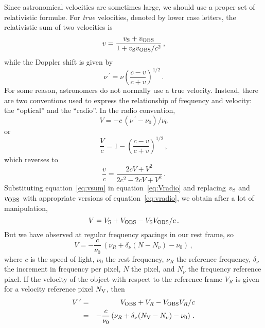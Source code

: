 Since astronomical velocities are sometimes large, we should use a
proper set of relativistic formul\ae.  For {\it true} velocities,
denoted by lower case letters, the relativistic sum of two velocities
is
\begin{equation}
   v =  \frac{v_{\hbox{\scriptsize S}} + v_{\hbox{\scriptsize OBS}}}{1 + v_{\hbox{\scriptsize S}}v_{\hbox{\scriptsize OBS}} / c^2} \, , \label{eq:vsum}
\end{equation}
while the Doppler shift is given by
\begin{equation}
   \nu\,^\prime = \nu\left( \frac{c - v}{c + v} \right)^{1/2} \, .
\end{equation}
For some reason, astronomers do not normally use a true velocity.
Instead, there are two conventions used to express the relationship of
frequency and velocity: the ``optical'' and the ``radio''.  In the
radio convention,
\begin{displaymath}
    V = -c\, (\nu\,^{\prime} - \nu_0 ) / \nu_0
\end{displaymath}
or
\begin{equation}
   \frac{V}{c} = 1 - \left( \frac{c - v}{c + v} \right)^{1/2} \, ,
        \label{eq:Vradio}
\end{equation}
which reverses to
\begin{equation}
   \frac{v}{c} = \frac{2cV + V^2}{2c^2 - 2cV + V^2} \, .
       \label{eq:vradio}
\end{equation}
Substituting equation~\ref{eq:vsum} in equation~\ref{eq:Vradio} and
replacing $v_{\hbox{\scriptsize S}}$ and $v_{\hbox{\scriptsize OBS}}$ with appropriate versions of
equation~\ref{eq:vradio}, we obtain after a lot of manipulation,
\begin{displaymath}
    V = V_{\hbox{\scriptsize S}} + V_{\hbox{\scriptsize OBS}} - V_{\hbox{\scriptsize S}} V_{\hbox{\scriptsize OBS}} / c \, .
\end{displaymath}
But we have observed at regular frequency spacings in our rest frame,
so
\begin{displaymath}
    V = - \frac{c}{\nu_0}\, \left(\nu_R + \delta_\nu(N-N_\nu)
           - \nu_0\right) \, ,
\end{displaymath}
where $c$ is the speed of light, $\nu_0$ the rest frequency, $\nu_R$
the reference frequency, $\delta_\nu$ the increment in frequency per
pixel, $N$ the pixel, and $N_\nu$ the frequency reference pixel.
If the velocity of the object with respect to the reference frame $V_R$
is given for a velocity reference pixel $N_{{\hbox{\scriptsize V}}}$, then
\begin{eqnarray*}
   V\,^{\prime} & = &V_{\hbox{\scriptsize OBS}} + V_R - V_{\hbox{\scriptsize OBS}} V_R / c \\
                & = & - \frac{c}{\nu_0} \left( \nu_R +
                        \delta_\nu(N_{\hbox{\scriptsize V}}-N_\nu) - \nu_0 \right) \,.
\end{eqnarray*}

